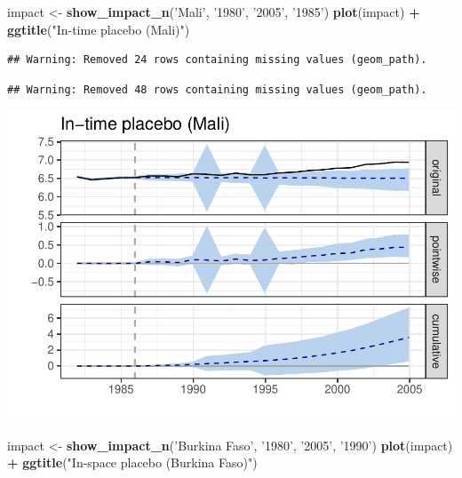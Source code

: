 \documentclass[]{article}
\newenvironment{Shaded}{\begin{snugshade}}{\end{snugshade}}
\newcommand{\KeywordTok}[1]{\textcolor[rgb]{0.13,0.29,0.53}{\textbf{#1}}}
\newcommand{\NormalTok}[1]{#1}
\newcommand{\OperatorTok}[1]{\textcolor[rgb]{0.81,0.36,0.00}{\textbf{#1}}}
\newcommand{\StringTok}[1]{\textcolor[rgb]{0.31,0.60,0.02}{#1}}
\begin{document}
\begin{Shaded}
\begin{Highlighting}[]
\NormalTok{impact <-}\StringTok{ }\KeywordTok{show_impact_n}\NormalTok{(}\StringTok{'Mali'}\NormalTok{, }\StringTok{'1980'}\NormalTok{, }\StringTok{'2005'}\NormalTok{, }\StringTok{'1985'}\NormalTok{)}
\KeywordTok{plot}\NormalTok{(impact) }\OperatorTok{+}\StringTok{ }\KeywordTok{ggtitle}\NormalTok{(}\StringTok{"In-time placebo (Mali)"}\NormalTok{)}
\end{Highlighting}
\end{Shaded}

\begin{verbatim}
## Warning: Removed 24 rows containing missing values (geom_path).
\end{verbatim}

\begin{verbatim}
## Warning: Removed 48 rows containing missing values (geom_path).
\end{verbatim}

\includegraphics{ProjectNotebook_files/figure-latex/unnamed-chunk-15-1.pdf}

\begin{Shaded}
\begin{Highlighting}[]
\NormalTok{impact <-}\StringTok{ }\KeywordTok{show_impact_n}\NormalTok{(}\StringTok{'Burkina Faso'}\NormalTok{, }\StringTok{'1980'}\NormalTok{, }\StringTok{'2005'}\NormalTok{, }\StringTok{'1990'}\NormalTok{)}
\KeywordTok{plot}\NormalTok{(impact) }\OperatorTok{+}\StringTok{ }\KeywordTok{ggtitle}\NormalTok{(}\StringTok{"In-space placebo (Burkina Faso)"}\NormalTok{)}
\end{Highlighting}
\end{Shaded}
\end{document}
